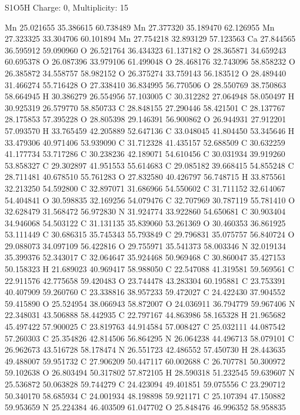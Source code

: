 \documentclass{article}
\begin{document}
S1O5H   Charge: 0, Multiplicity: 15    
   
Mn 25.021655 35.386615 60.738489
Mn 27.377320 35.189470 62.126955
Mn 27.323325 33.304706 60.101894
Mn 27.754218 32.893129 57.123563
Ca 27.844565 36.595912 59.090960
O 26.521764 36.434323 61.137182
O 28.365871 34.659243 60.695378
O 26.087396 33.979106 61.499048
O 28.468176 32.743096 58.858232
O 26.385872 34.558757 58.982152
O 26.375274 33.759143 56.183512
O 28.489440 31.466274 55.716428
O 27.338410 36.834995 56.770506
O 28.550769 38.750863 58.664945
H 30.386279 26.554956 57.103005
C 30.312282 27.064948 58.050497
H 30.925319 26.579770 58.850733
C 28.848155 27.290446 58.421501
C 28.137767 28.175853 57.395228
O 28.805398 29.146391 56.900862
O 26.944931 27.912201 57.093570
H 33.765459 42.205889 52.647136
C 33.048045 41.804450 53.345646
H 33.479306 40.971406 53.939090
C 31.712328 41.435157 52.688509
C 30.632259 41.177734 53.717286
C 30.238236 42.189071 54.610456
C 30.031934 39.919260 53.858327
C 29.302897 41.951553 55.614683
C 29.085182 39.668415 54.855248
C 28.711481 40.678510 55.761283
O 27.832580 40.426797 56.748715
H 33.875561 32.213250 54.592800
C 32.897071 31.686966 54.550602
C 31.711152 32.614067 54.404841
O 30.598835 32.169256 54.079476
C 32.707969 30.787119 55.781410
O 32.628479 31.568472 56.972830
N 31.924774 33.922860 54.650681
C 30.903404 34.946068 54.503122
C 31.131135 35.839060 53.261369
O 30.460353 36.861925 53.111449
C 30.686315 35.745343 55.793849
C 29.796831 35.075757 56.840724
O 29.088073 34.097109 56.422816
O 29.755971 35.541373 58.003346
N 32.019134 35.399376 52.343017
C 32.064647 35.924468 50.969468
C 30.860047 35.427153 50.158323
H 21.689023 40.969417 58.988050
C 22.547088 41.319581 59.569561
C 22.911576 42.775658 59.420483
O 23.744478 43.283304 60.195881
C 23.753391 40.407909 59.260760
C 23.338816 38.957233 59.472027
C 24.422430 37.904552 59.415890
O 25.524954 38.066943 58.872007
O 24.036911 36.794779 59.967406
N 22.348031 43.506888 58.442935
C 22.797167 44.863986 58.165328
H 21.965682 45.497422 57.900025
C 23.819763 44.914584 57.008427
C 25.032111 44.087542 57.260303
C 25.354826 42.814506 56.864295
N 26.064238 44.496713 58.079101
C 26.962673 43.516728 58.178474
N 26.551723 42.486552 57.450730
H 28.443635 49.488007 59.951732
C 27.906209 50.447117 60.002688
C 26.707781 50.300972 59.102638
O 26.803494 50.317802 57.872105
H 28.590318 51.232545 59.639607
N 25.536872 50.063828 59.744279
C 24.423094 49.401851 59.075556
C 23.290712 50.340170 58.685934
C 24.001934 48.198898 59.921171
C 25.107394 47.150882 59.953659
N 25.224384 46.403509 61.047702
O 25.848476 46.996352 58.958835
\end{document}
